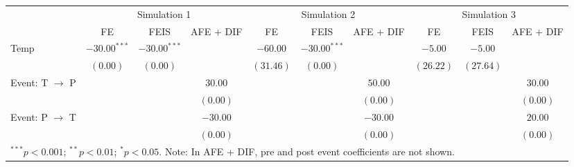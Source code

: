 
\begin{tabular}{l c c c c c c c c c}
\toprule
 & \multicolumn{3}{c}{Simulation 1} & \multicolumn{3}{c}{Simulation 2} & \multicolumn{3}{c}{Simulation 3} \\
\cmidrule(lr){2-4} \cmidrule(lr){5-7} \cmidrule(lr){8-10}
 & FE & FEIS & AFE + DIF & FE & FEIS & AFE + DIF & FE & FEIS & AFE + DIF \\
\midrule
Temp                     & $-30.00^{***}$ & $-30.00^{***}$ &          & $-60.00$  & $-30.00^{***}$ &          & $-5.00$   & $-5.00$   &          \\
                         & $(0.00)$       & $(0.00)$       &          & $(31.46)$ & $(0.00)$       &          & $(26.22)$ & $(27.64)$ &          \\
Event: T $\rightarrow$ P &                &                & $30.00$  &           &                & $50.00$  &           &           & $30.00$  \\
                         &                &                & $(0.00)$ &           &                & $(0.00)$ &           &           & $(0.00)$ \\
Event: P $\rightarrow$ T &                &                & $-30.00$ &           &                & $-30.00$ &           &           & $20.00$  \\
                         &                &                & $(0.00)$ &           &                & $(0.00)$ &           &           & $(0.00)$ \\
\bottomrule
\multicolumn{10}{l}{\scriptsize{$^{***}p<0.001$; $^{**}p<0.01$; $^{*}p<0.05$. Note: In AFE + DIF, pre and post event coefficients are not shown.}}
\end{tabular}
